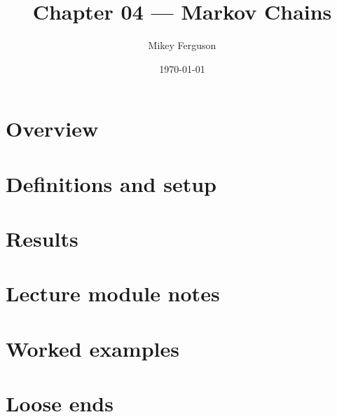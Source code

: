 \documentclass[11pt]{article}
\title{Chapter 04 --- Markov Chains}
\author{Mikey Ferguson}
\date{\today}
\begin{document}
\maketitle
\tableofcontents
\bigskip

\section{Overview}

\section{Definitions and setup}

\section{Results}

\section{Lecture module notes}

\section{Worked examples}

\section{Loose ends}
\end{document}

